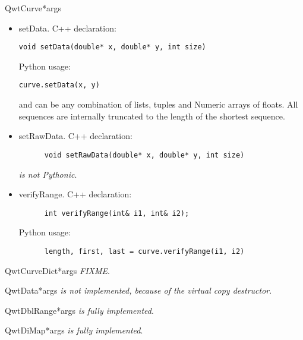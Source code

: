 \documentclass{manual}
\begin{document}
\begin{classdesc}{QwtCurve}{*args}

  \begin{itemize}

    \item{setData}. C++ declaration:
      \begin{verbatim}
void setData(double* x, double* y, int size)
      \end{verbatim}
      Python usage:
      \begin{verbatim}
curve.setData(x, y)
      \end{verbatim}
       and  can be any combination of lists, tuples and Numeric
      arrays of floats.
      All sequences are internally truncated to the length of the shortest
      sequence.

    \item{setRawData}. C++ declaration:
      \begin{verbatim}
      void setRawData(double* x, double* y, int size)
      \end{verbatim}
       \emph{is not Pythonic}.

    \item{verifyRange}. C++ declaration:
      \begin{verbatim}
      int verifyRange(int& i1, int& i2);
      \end{verbatim}
      Python usage:
      \begin{verbatim}
      length, first, last = curve.verifyRange(i1, i2)
      \end{verbatim}

  \end{itemize}
\end{classdesc}

\begin{classdesc}{QwtCurveDict}{*args}
\emph{FIXME}.
\end{classdesc}

\begin{classdesc}{QwtData}{*args}
\emph{is not implemented, because of the virtual copy destructor}.
\end{classdesc}

\begin{classdesc}{QwtDblRange}{*args}
\emph{is fully implemented}.
\end{classdesc}

\begin{classdesc}{QwtDiMap}{*args}
\emph{is fully implemented}.
\end{classdesc}
\end{document}
